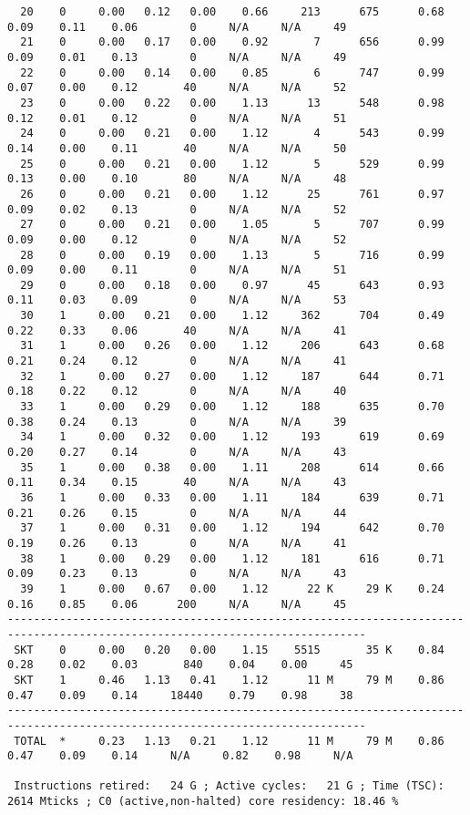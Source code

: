 \begin{lstlisting}
  20    0     0.00   0.12   0.00    0.66     213      675      0.68    0.09    0.11    0.06        0     N/A     N/A     49
  21    0     0.00   0.17   0.00    0.92       7      656      0.99    0.09    0.01    0.13        0     N/A     N/A     49
  22    0     0.00   0.14   0.00    0.85       6      747      0.99    0.07    0.00    0.12       40     N/A     N/A     52
  23    0     0.00   0.22   0.00    1.13      13      548      0.98    0.12    0.01    0.12        0     N/A     N/A     51
  24    0     0.00   0.21   0.00    1.12       4      543      0.99    0.14    0.00    0.11       40     N/A     N/A     50
  25    0     0.00   0.21   0.00    1.12       5      529      0.99    0.13    0.00    0.10       80     N/A     N/A     48
  26    0     0.00   0.21   0.00    1.12      25      761      0.97    0.09    0.02    0.13        0     N/A     N/A     52
  27    0     0.00   0.21   0.00    1.05       5      707      0.99    0.09    0.00    0.12        0     N/A     N/A     52
  28    0     0.00   0.19   0.00    1.13       5      716      0.99    0.09    0.00    0.11        0     N/A     N/A     51
  29    0     0.00   0.18   0.00    0.97      45      643      0.93    0.11    0.03    0.09        0     N/A     N/A     53
  30    1     0.00   0.21   0.00    1.12     362      704      0.49    0.22    0.33    0.06       40     N/A     N/A     41
  31    1     0.00   0.26   0.00    1.12     206      643      0.68    0.21    0.24    0.12        0     N/A     N/A     41
  32    1     0.00   0.27   0.00    1.12     187      644      0.71    0.18    0.22    0.12        0     N/A     N/A     40
  33    1     0.00   0.29   0.00    1.12     188      635      0.70    0.38    0.24    0.13        0     N/A     N/A     39
  34    1     0.00   0.32   0.00    1.12     193      619      0.69    0.20    0.27    0.14        0     N/A     N/A     43
  35    1     0.00   0.38   0.00    1.11     208      614      0.66    0.11    0.34    0.15       40     N/A     N/A     43
  36    1     0.00   0.33   0.00    1.11     184      639      0.71    0.21    0.26    0.15        0     N/A     N/A     44
  37    1     0.00   0.31   0.00    1.12     194      642      0.70    0.19    0.26    0.13        0     N/A     N/A     41
  38    1     0.00   0.29   0.00    1.12     181      616      0.71    0.09    0.23    0.13        0     N/A     N/A     43
  39    1     0.00   0.67   0.00    1.12      22 K     29 K    0.24    0.16    0.85    0.06      200     N/A     N/A     45
-----------------------------------------------------------------------------------------------------------------------------
 SKT    0     0.00   0.20   0.00    1.15    5515       35 K    0.84    0.28    0.02    0.03       840    0.04    0.00     45
 SKT    1     0.46   1.13   0.41    1.12      11 M     79 M    0.86    0.47    0.09    0.14     18440    0.79    0.98     38
-----------------------------------------------------------------------------------------------------------------------------
 TOTAL  *     0.23   1.13   0.21    1.12      11 M     79 M    0.86    0.47    0.09    0.14     N/A     0.82    0.98     N/A

 Instructions retired:   24 G ; Active cycles:   21 G ; Time (TSC): 2614 Mticks ; C0 (active,non-halted) core residency: 18.46 %
\end{lstlisting}
